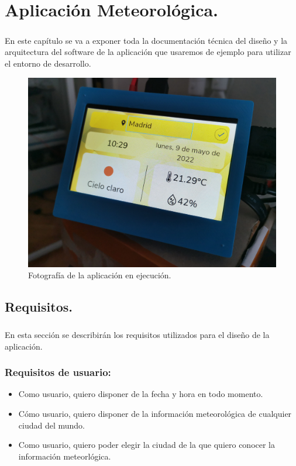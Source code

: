 \chapter{Aplicación Meteorológica.}\label{sec:AplicacionMeteorologica}

\paragraph{}En este capítulo se va a exponer toda la documentación técnica del diseño
y la arquitectura del software de la aplicación que usaremos de ejemplo para utilizar
el entorno de desarrollo.

\begin{figure}[H]
	\centering
	\includegraphics[width=0.9\linewidth]{imgs/app1}
	\caption[Portada de la app]{Fotografía de la aplicación en ejecución.}
	\label{img:rpi-weather-portada}
\end{figure}

\section{Requisitos.}

\paragraph{}En esta sección se describirán los requisitos utilizados para el diseño
de la aplicación.

\subsection{Requisitos de usuario:}
\begin{itemize}
    \item Como usuario, quiero disponer de la fecha y hora en todo momento.
    \item Cómo usuario, quiero disponer de la información meteorológica de cualquier
    ciudad del mundo.
    \item Como usuario, quiero poder elegir la ciudad de la que quiero conocer la
    información meteorlógica.
\end{itemize}

